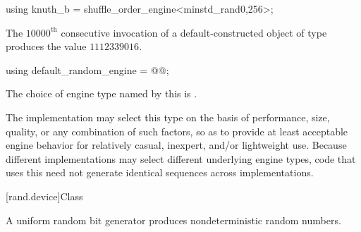 %
%
\begin{itemdecl}
using knuth_b = shuffle_order_engine<minstd_rand0,256>;
\end{itemdecl}

\begin{itemdescr}
\pnum
\required
 The $10000^\text{th}$ consecutive invocation
 of a default-constructed object
 of type 
 produces the value $1112339016$.
\end{itemdescr}%

%
%
\begin{itemdecl}
using default_random_engine = @\textit{}@;
\end{itemdecl}

\begin{itemdescr}
\pnum
\remarks
The choice of engine type
named by this 
is .
\begin{note}
 The implementation
 may select this type
 on the basis of performance,
 size,
 quality,
 or any combination of such factors,
 so as to provide at least acceptable engine behavior
 for relatively casual, inexpert, and/or lightweight use.
 Because different implementations
 may select different underlying engine types,
 code that uses this 
 need not generate identical sequences across implementations.
\end{note}
\end{itemdescr}%
%
%




[rand.device]{Class }%
%

\pnum
A 
uniform random bit generator
produces nondeterministic random numbers.

